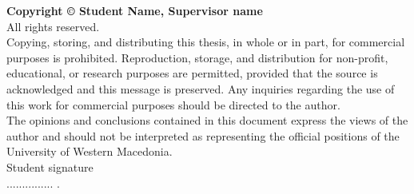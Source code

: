 \clearpage
\thispagestyle{empty}

{\normalsize \textbf{Copyright © \the\year{} Student Name, Supervisor name}}\\
All rights reserved.\\
\newline
Copying, storing, and distributing this thesis, in whole or in part, for commercial purposes is prohibited. Reproduction, storage, and distribution for non-profit, educational, or research purposes are permitted, provided that the source is acknowledged and this message is preserved. Any inquiries regarding the use of this work for commercial purposes should be directed to the author.\\
\newline
The opinions and conclusions contained in this document express the views of the author and should not be interpreted as representing the official positions of the University of Western Macedonia.\\

Student signature\\ 

............... .